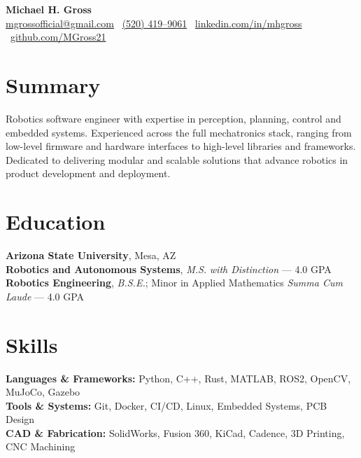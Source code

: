 \documentclass[10pt]{article}
\begin{document}

\begin{center}
    {\LARGE \textbf{Michael H. Gross}} \\
    \href{mailto:mgrossofficial@gmail.com}{mgrossofficial@gmail.com} \textbar\ \href{tel:+15204199061}{(520) 419--9061} \textbar\ 
    \href{https://www.linkedin.com/in/mhgross}{linkedin.com/in/mhgross} \textbar\ \href{https://github.com/MGross21}{github.com/MGross21}
\end{center}

\section*{Summary}
Robotics software engineer with expertise in perception, planning, control and embedded systems. Experienced across the full mechatronics stack, ranging from low-level firmware and hardware interfaces to high-level libraries and frameworks. Dedicated to delivering modular and scalable solutions that advance robotics in product development and deployment.

\section*{Education}
\textbf{Arizona State University}, Mesa, AZ \\
\textbf{Robotics and Autonomous Systems}, \textit{M.S.} \hfill \textit{with Distinction} --- 4.0 GPA \\
\textbf{Robotics Engineering}, \textit{B.S.E.}; Minor in Applied Mathematics \hfill \textit{Summa Cum Laude} --- 4.0 GPA

\section*{Skills}
\textbf{Languages \& Frameworks:} Python, C++, Rust, MATLAB, ROS2, OpenCV, MuJoCo, Gazebo \\
\textbf{Tools \& Systems:} Git, Docker, CI/CD, Linux, Embedded Systems, PCB Design \\
\textbf{CAD \& Fabrication:} SolidWorks, Fusion 360, KiCad, Cadence, 3D Printing, CNC Machining
\end{document}
